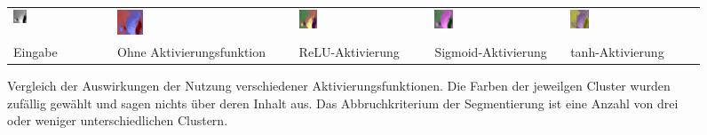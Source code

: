 \begin{figure}[h!]
\begin{tabular}{C{0.19\textwidth}C{0.19\textwidth}C{0.19\textwidth}C{0.19\textwidth}C{0.19\textwidth}}
		\includegraphics[width=0.15\textwidth]{images/p03/p03_04.png} &
		\includegraphics[width=0.15\textwidth]{images/gen/activation_functions/p03_04.png_None.png} &
		\includegraphics[width=0.15\textwidth]{images/gen/activation_functions/p03_04.png_relu.png} &
		\includegraphics[width=0.15\textwidth]{images/gen/activation_functions/p03_04.png_sigmoid.png} &
		\includegraphics[width=0.15\textwidth]{images/gen/activation_functions/p03_04.png_tanh.png} \\
		
		\hspace{2pt}\newline\centering Eingabe & 
		\hspace{2pt}\newline\centering Ohne Aktivierungsfunktion &
		\hspace{2pt}\newline\centering ReLU-Aktivierung &
		\hspace{2pt}\newline\centering Sigmoid-Aktivierung &
		\hspace{2pt}\newline\centering tanh-Aktivierung 
	\end{tabular}
	\caption{Vergleich der Auswirkungen der Nutzung verschiedener Aktivierungsfunktionen. Die Farben der jeweilgen Cluster wurden zufällig gewählt und sagen nichts über deren Inhalt aus. Das Abbruchkriterium der Segmentierung ist eine Anzahl von drei oder weniger unterschiedlichen Clustern.}
	\label{fig:activation_comparision}
\end{figure}

